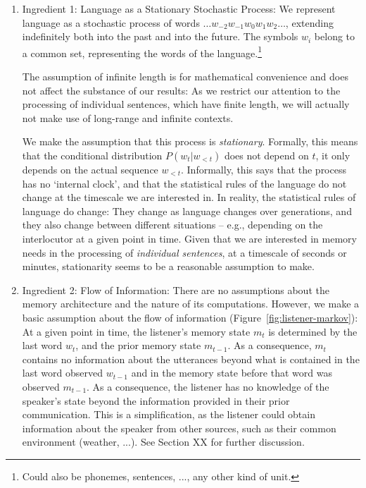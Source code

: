 \begin{enumerate}
\item Ingredient 1: Language as a Stationary Stochastic Process:
We represent language as a stochastic process of words $\dots w_{-2} w_{-1} w_0 w_{1} w_{2} \dots$, extending indefinitely both into the past and into the future.
The symbols $w_i$ belong to a common set, representing the words of the language.\footnote{Could also be phonemes, sentences, ..., any other kind of unit.}

The assumption of infinite length is for mathematical convenience and does not affect the substance of our results:
As we restrict our attention to the processing of individual sentences, which have finite length, we will actually not make use of long-range and infinite contexts.

We make the assumption that this process is \emph{stationary}.
Formally, this means that the conditional distribution $P(w_t|w_{<t})$ does not depend on $t$, it only depends on the actual sequence $w_{<t}$.
Informally, this says that the process has no `internal clock', and that the statistical rules of the language do not change at the timescale we are interested in.
In reality, the statistical rules of language do change: They change as language changes over generations, and they also change between different situations -- e.g., depending on the interlocutor at a given point in time.
Given that we are interested in memory needs in the processing of \emph{individual sentences}, at a timescale of seconds or minutes, stationarity seems to be a reasonable assumption to make.

\item Ingredient 2: Flow of Information: There are no assumptions about the memory architecture and the nature of its computations.
However, we make a basic assumption about the flow of information (Figure~\ref{fig:listener-markov}):
At a given point in time, the listener's memory state $m_t$ is determined by the last word $w_t$, and the prior memory state $m_{t-1}$.
As a consequence, $m_t$ contains no information about the utterances beyond what is contained in the last word observed $w_{t-1}$ and in the memory state before that word was observed $m_{t-1}$.
As a consequence, the listener has no knowledge of the speaker's state beyond the information provided in their prior communication.
This is a simplification, as the listener could obtain information about the speaker from other sources, such as their common environment (weather, ...).
See Section XX for further discussion.
\end{enumerate}


